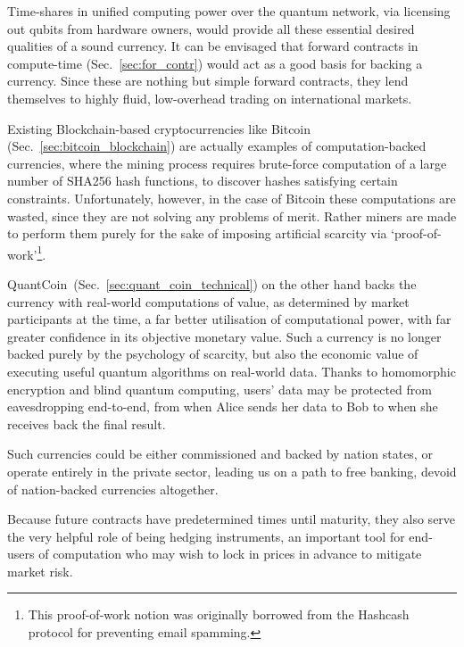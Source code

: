 Time-shares in unified computing power over the quantum network, via licensing out qubits from hardware owners, would provide all these essential desired qualities of a sound currency. It can be envisaged that forward contracts in compute-time (Sec.~\ref{sec:for_contr}) would act as a good basis for backing a currency. Since these are nothing but simple forward contracts, they lend themselves to highly fluid, low-overhead trading on international markets.

Existing Blockchain-based cryptocurrencies like Bitcoin (Sec.~\ref{sec:bitcoin_blockchain}) are actually examples of computation-backed currencies, where the mining process requires brute-force computation of a large number of SHA256 hash functions, to discover hashes satisfying certain constraints. Unfortunately, however, in the case of Bitcoin these computations are wasted, since they are not solving any problems of merit. Rather miners are made to perform them purely for the sake of imposing artificial scarcity via `proof-of-work'\footnote{This proof-of-work notion was originally borrowed from the Hashcash protocol for preventing email spamming.}.

QuantCoin\texttrademark\, (Sec.~\ref{sec:quant_coin_technical}) on the other hand backs the currency with real-world computations of value, as determined by market participants at the time, a far better utilisation of computational power, with far greater confidence in its objective monetary value. Such a currency is no longer backed purely by the psychology of scarcity, but also the economic value of executing useful quantum algorithms on real-world data. Thanks to homomorphic encryption and blind quantum computing, users' data may be protected from eavesdropping end-to-end, from when Alice sends her data to Bob to when she receives back the final result.

Such currencies could be either commissioned and backed by nation states, or operate entirely in the private sector, leading us on a path to free banking, devoid of nation-backed currencies altogether.

Because future contracts have predetermined times until maturity, they also serve the very helpful role of being hedging instruments, an important tool for end-users of computation who may wish to lock in prices in advance to mitigate market risk.

